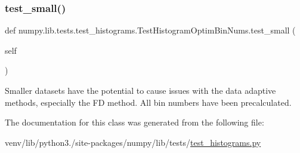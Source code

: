 \subsubsection{\texorpdfstring{test\+\_\+small()}{test\_small()}}
{\footnotesize\ttfamily def numpy.\+lib.\+tests.\+test\+\_\+histograms.\+Test\+Histogram\+Optim\+Bin\+Nums.\+test\+\_\+small (\begin{DoxyParamCaption}\item[{}]{self }\end{DoxyParamCaption})}

\begin{DoxyVerb}Smaller datasets have the potential to cause issues with the data
adaptive methods, especially the FD method. All bin numbers have been
precalculated.
\end{DoxyVerb}
 

The documentation for this class was generated from the following file\+:\begin{DoxyCompactItemize}
\item 
venv/lib/python3./site-\/packages/numpy/lib/tests/\hyperlink{test__histograms_8py}{test\+\_\+histograms.\+py}\end{DoxyCompactItemize}
